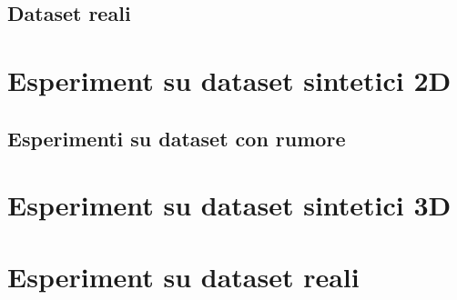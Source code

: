 

\subsection{Dataset reali}



\section{Esperiment su dataset sintetici 2D}

\subsection{Esperimenti su dataset con rumore}

\section{Esperiment su dataset sintetici 3D}

\section{Esperiment su dataset reali}


